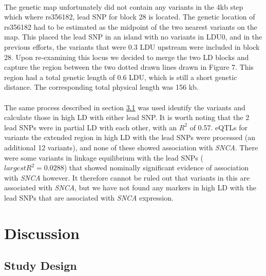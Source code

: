 \documentclass{article}
\begin{document}
\\The genetic map unfortunately did not contain any variants in the 4kb step which where rs356182, lead SNP for block 28 is located. The genetic location of rs356182 had to be estimated as the midpoint of the two nearest variants on the map. This placed the lead SNP in an island with no variants in LDU0, and in the previous efforts, the variants that were 0.3 LDU  upstream were included in block 28. Upon re-examining this locus we decided to merge the two LD blocks and capture the region between the two dotted drawn lines drawn in Figure 7. This region had a total genetic length of 0.6 LDU, which is still a short genetic distance. The corresponding total physical length was 156 kb.
\\
\\The same process described in section \hyperref[subsec:SNPs]{3.1} was used identify the variants and calculate those in high LD with either lead SNP. It is worth noting that the 2 lead SNPs were in partial LD with each other, with an $R^2$ of 0.57. eQTLs for variants the extended region in high LD with the lead SNPs were processed (an additional 12 variants), and none of these showed association with \textit{SNCA}. There were some variants in linkage equilibrium with the lead SNPs ($largest R^2 = 0.0288$) that showed nominally significant evidence of association with \textit{SNCA} however. It therefore cannot be ruled out that variants in this are associated with \textit{SNCA}, but we have not found any markers in high LD with the lead SNPs that are associated with \textit{SNCA} expression.
\section{Discussion}
\subsection{Study Design}
\label{subsec:studydesign}
\end{document}
